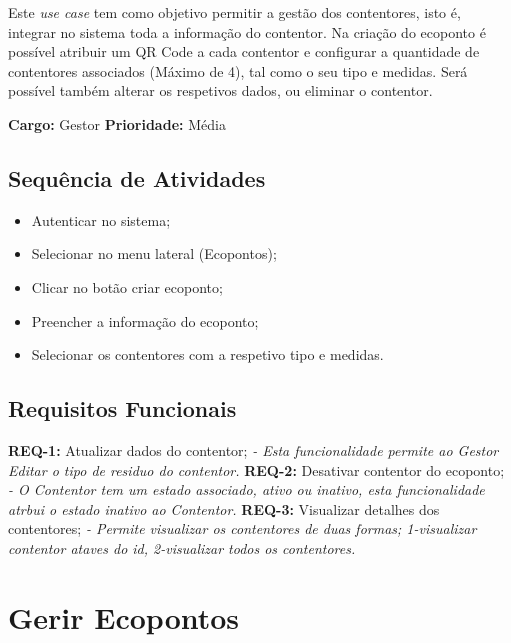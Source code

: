 \documentclass{scrreprt}
\begin{document}
	Este \textit{use case} tem como objetivo permitir a gestão dos contentores, isto é, integrar no sistema toda a informação do contentor. Na criação do ecoponto é possível atribuir um QR Code a cada contentor e configurar a quantidade de contentores associados (Máximo de 4), tal como o seu tipo e medidas. Será possível também alterar os respetivos dados, ou eliminar o contentor.
	
	\textbf{Cargo: }Gestor  \newline
	\textbf{Prioridade: }Média \newline
	
	\subsection{Sequência de Atividades}
	
	\begin{itemize}
		\item Autenticar no sistema;
		\item Selecionar no menu lateral (Ecopontos);
		\item Clicar no botão criar ecoponto;
		\item Preencher a informação do ecoponto;
		\item Selecionar os contentores com a respetivo tipo e medidas.
	\end{itemize}
	
	
	\subsection{Requisitos Funcionais}
	\textbf{REQ-1:} Atualizar dados do contentor;\newline
	    \textit{- Esta funcionalidade permite ao Gestor Editar o tipo de residuo do contentor.}\newline
	\textbf{REQ-2:} Desativar contentor do ecoponto;\newline
	    \textit{- O Contentor tem um estado associado, ativo ou inativo, esta funcionalidade atrbui o estado inativo ao Contentor.}\newline
	\textbf{REQ-3:} Visualizar detalhes dos contentores;\newline
	\textit{- Permite visualizar os contentores de duas formas; 1-visualizar contentor ataves do id, 2-visualizar todos os contentores.}
	
	\section{Gerir Ecopontos}
	
\end{document}
